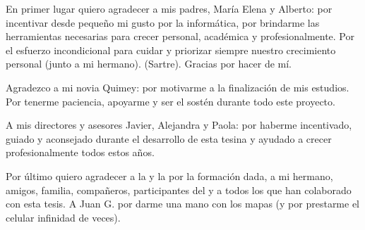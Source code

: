 
En primer lugar quiero agradecer a mis padres, María Elena y Alberto: por incentivar desde pequeño mi gusto por la informática, por brindarme las herramientas necesarias para crecer personal, académica y profesionalmente. Por el esfuerzo incondicional para cuidar y priorizar siempre nuestro crecimiento personal (junto a mi hermano).  (Sartre). Gracias por hacer de mí.

Agradezco a mi novia Quimey: por motivarme a la finalización de mis estudios. Por tenerme paciencia, apoyarme y ser el sostén durante todo este proyecto.

A mis directores y asesores Javier, Alejandra y Paola: por haberme incentivado, guiado y aconsejado durante el desarrollo de esta tesina y ayudado a crecer profesionalmente todos estos años.

Por último quiero agradecer a la \facultad{} y la \unlp{} por la formación dada, a mi hermano, amigos, familia, compañeros, participantes del  y a todos los que han colaborado con esta tesis. A Juan G. por darme una mano con los mapas (y por prestarme el celular infinidad de veces).
